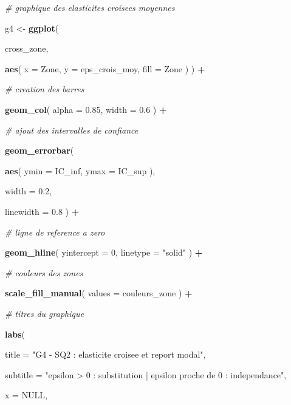 \documentclass[
]{article}
\newenvironment{Shaded}{\begin{snugshade}}{\end{snugshade}}
\newcommand{\AttributeTok}[1]{\textcolor[rgb]{0.13,0.29,0.53}{#1}}
\newcommand{\CommentTok}[1]{\textcolor[rgb]{0.56,0.35,0.01}{\textit{#1}}}
\newcommand{\ConstantTok}[1]{\textcolor[rgb]{0.56,0.35,0.01}{#1}}
\newcommand{\DecValTok}[1]{\textcolor[rgb]{0.00,0.00,0.81}{#1}}
\newcommand{\FloatTok}[1]{\textcolor[rgb]{0.00,0.00,0.81}{#1}}
\newcommand{\FunctionTok}[1]{\textcolor[rgb]{0.13,0.29,0.53}{\textbf{#1}}}
\newcommand{\NormalTok}[1]{#1}
\newcommand{\OtherTok}[1]{\textcolor[rgb]{0.56,0.35,0.01}{#1}}
\newcommand{\SpecialCharTok}[1]{\textcolor[rgb]{0.81,0.36,0.00}{\textbf{#1}}}
\newcommand{\StringTok}[1]{\textcolor[rgb]{0.31,0.60,0.02}{#1}}
\begin{document}
\begin{Shaded}
\begin{Highlighting}[]
\CommentTok{\# graphique des elasticites croisees moyennes}

\NormalTok{g4 }\OtherTok{\textless{}{-}} \FunctionTok{ggplot}\NormalTok{(}

\NormalTok{  cross\_zone,}

  \FunctionTok{aes}\NormalTok{(}
    \AttributeTok{x =}\NormalTok{ Zone,}
    \AttributeTok{y =}\NormalTok{ eps\_crois\_moy,}
    \AttributeTok{fill =}\NormalTok{ Zone}
\NormalTok{  )}
\NormalTok{) }\SpecialCharTok{+}

  \CommentTok{\# creation des barres}

  \FunctionTok{geom\_col}\NormalTok{(}
    \AttributeTok{alpha =} \FloatTok{0.85}\NormalTok{,}
    \AttributeTok{width =} \FloatTok{0.6}
\NormalTok{  ) }\SpecialCharTok{+}

  \CommentTok{\# ajout des intervalles de confiance}

  \FunctionTok{geom\_errorbar}\NormalTok{(}

    \FunctionTok{aes}\NormalTok{(}
      \AttributeTok{ymin =}\NormalTok{ IC\_inf,}
      \AttributeTok{ymax =}\NormalTok{ IC\_sup}
\NormalTok{    ),}

    \AttributeTok{width =} \FloatTok{0.2}\NormalTok{,}

    \AttributeTok{linewidth =} \FloatTok{0.8}
\NormalTok{  ) }\SpecialCharTok{+}

  \CommentTok{\# ligne de reference a zero}

  \FunctionTok{geom\_hline}\NormalTok{(}
    \AttributeTok{yintercept =} \DecValTok{0}\NormalTok{,}
    \AttributeTok{linetype =} \StringTok{"solid"}
\NormalTok{  ) }\SpecialCharTok{+}

  \CommentTok{\# couleurs des zones}

  \FunctionTok{scale\_fill\_manual}\NormalTok{(}
    \AttributeTok{values =}\NormalTok{ couleurs\_zone}
\NormalTok{  ) }\SpecialCharTok{+}

  \CommentTok{\# titres du graphique}

  \FunctionTok{labs}\NormalTok{(}

    \AttributeTok{title =} \StringTok{"G4 {-} SQ2 : elasticite croisee et report modal"}\NormalTok{,}

    \AttributeTok{subtitle =} \StringTok{"epsilon \textgreater{} 0 : substitution | epsilon proche de 0 : independance"}\NormalTok{,}

    \AttributeTok{x =} \ConstantTok{NULL}\NormalTok{,}


\end{Highlighting}
\end{Shaded}
\end{document}
